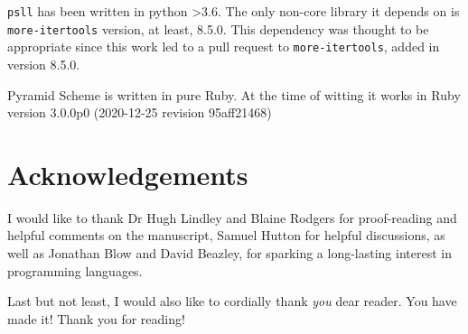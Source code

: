 \documentclass[aip,jcp,reprint,footinbib]{revtex4-1}
\let\tt\texttt
\newcommand\psll{\texttt{psll}\xspace}
\begin{document}
\psll has been written in python >3.6. The only non-core library it depends on is \tt{more-itertools} version, at least, 8.5.0. This dependency was thought to be appropriate since this work led to a pull request to \tt{more-itertools}, added in version 8.5.0.~\cite{more_itertools}

Pyramid Scheme is written in pure Ruby. At the time of witting it works in Ruby version 3.0.0p0 (2020-12-25 revision 95aff21468)

\section*{Acknowledgements}

I would like to thank Dr Hugh Lindley and Blaine Rodgers for proof-reading and helpful comments on the manuscript,  Samuel Hutton for helpful discussions, as well as Jonathan Blow and David Beazley, for sparking a long-lasting interest in programming languages.

Last but not least, I would also like to cordially thank \emph{you} dear reader. You have made it! Thank you for reading!

\nocite{*}



\onecolumngrid
\end{document}
